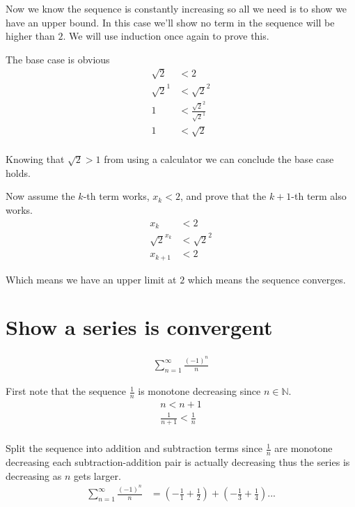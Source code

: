 \documentclass{article}
\begin{document}
Now we know the sequence is constantly increasing so all we need is to show we
have an upper bound. In this case we'll show no term in the sequence will be
higher than $2$. We will use induction once again to prove this.

The base case is obvious
\begin{align*}
    \sqrt{2} &< 2 \\
    \sqrt{2}^1 &< \sqrt{2}^2 \\
    1 &< \frac{\sqrt{2}^2}{\sqrt{2}^1} \\
    1 &< \sqrt{2} \\
\end{align*}

Knowing that $\sqrt{2} > 1$ from using a calculator we can conclude the base
case holds.

Now assume the $k$-th term works, $x_k < 2$, and
prove that the $k+1$-th term also works.
\begin{align*}
    x_k &< 2 \\
    \sqrt{2}^{x_k} &< \sqrt{2}^2 \\
    x_{k+1} &< 2
\end{align*}

Which means we have an upper limit at $2$ which means the sequence converges.

\section{Show a series is convergent}
\begin{align*}
    \sum^\infty_{n=1} \frac{(-1)^n}{n}
\end{align*}

First note that the sequence $\frac{1}{n}$ is monotone decreasing since
$n \in \mathbb{N}$.
\begin{align*}
    n < n+1 \\
    \frac{1}{n+1} < \frac{1}{n} \\
\end{align*}

Split the sequence into addition and subtraction terms
since $\frac{1}{n}$ are monotone decreasing each subtraction-addition pair
is actually decreasing thus the series is decreasing as $n$ gets larger.
\begin{align*}
    \sum^\infty_{n=1} \frac{(-1)^n}{n}
    &= \left(-\frac{1}{1} + \frac{1}{2}\right)
    + \left(-\frac{1}{3} + \frac{1}{4}\right) ... \\
\end{align*}
\end{document}

